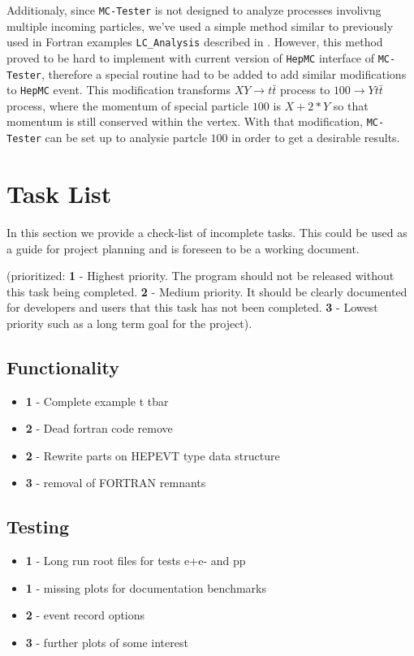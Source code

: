 \documentclass[]{Photos_interface_design}
\begin{document}
Additionaly, since {\tt MC-Tester} is not designed to analyze processes involivng
multiple incoming particles, we've used a simple method similar to previously
used in Fortran examples {\tt LC\_Analysis} described in \cite{??}. However,
this method proved to be hard to implement with current version of {\tt HepMC}
interface of {\tt MC-Tester}, therefore a special routine had to be added
to add similar modifications to {\tt HepMC} event. This modification transforms
$X Y \rightarrow t \bar t$ process to $100 \rightarrow Y t \bar t$ process,
where the momentum of special particle $100$ is $X + 2*Y$ so that momentum is still
conserved within the vertex. With that modification, {\tt MC-Tester} can be set up
to analysie partcle $100$ in order to get a desirable results.

\newpage

\section*{Task List}
In this section we provide a check-list of incomplete tasks.
This could be used as a guide for project planning and is foreseen
to be a working document. 

(prioritized: {\bf 1} - Highest priority. The program should not be
released without this task being completed. {\bf 2} - Medium priority.
It should be clearly documented for developers and users that this task has not
been completed. {\bf 3} - Lowest priority such as a long term goal 
for the project).

\subsection*{Functionality}
\begin{itemize}
  \item[\ding{111}]{\bf 1} - Complete example t tbar
  \item[\ding{111}]{\bf 2} - Dead fortran code remove
  \item[\ding{111}]{\bf 2} - Rewrite parts on HEPEVT type data structure
  \item[\ding{111}]{\bf 3} - removal of FORTRAN remnants
\end{itemize}

\subsection*{Testing}
\begin{itemize}
  \item[\ding{111}]{\bf 1} - Long run root files for tests e+e- and pp
  \item[\ding{111}]{\bf 1} - missing plots for documentation benchmarks
  \item[\ding{111}]{\bf 2} - event record options
  \item[\ding{111}]{\bf 3} - further plots of some interest
\end{itemize}
\end{document}
